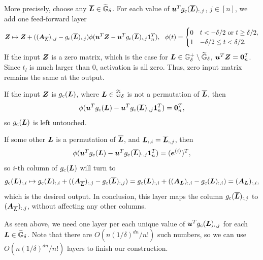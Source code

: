 More precisely, choose any $\overline {{\bm{L}}} \in \widetilde{{\mathbb{G}}}_{\delta}$.
For each value of ${\bm{u}}^T g_{\rm c}(\overline {{\bm{L}}})_{:,j}$, $j \in [n]$, we add one feed-forward layer
\begin{equation*}
    {\bm{Z}} \mapsto {\bm{Z}} + (({\bm{A}}_{\overline {{\bm{L}}}})_{:,j} - g_{\rm c}({\overline {{\bm{L}}}})_{:,j}) \phi ({\bm{u}}^T {\bm{Z}} - {\bm{u}}^T g_{\rm c}({\overline {{\bm{L}}}})_{:,j} {\bm{1}}_n^T),
    ~~
    \phi(t) = 
    \begin{cases}
    0 & t < -\delta/2 \text{ or } t \geq \delta/2,\\
    1 & -\delta/2 \leq t < \delta/2.
    \end{cases}
\end{equation*}
If the input ${\bm{Z}}$ is a zero matrix, which is the case for ${\bm{L}} \in {\mathbb{G}}^+_{\delta} \setminus \widetilde{{\mathbb{G}}}_{\delta}$, ${\bm{u}}^T {\bm{Z}} = {\bm{0}}_n^T$. Since $t_l$ is much larger than $0$, activation is all zero. Thus, zero input matrix remains the same at the output.

If the input ${\bm{Z}}$ is $g_{\rm c}({\bm{L}})$, where ${\bm{L}} \in \widetilde{{\mathbb{G}}}_{\delta}$ is not a permutation of $\overline {{\bm{L}}}$, then 
\begin{equation*}
    \phi({\bm{u}}^T g_{\rm c}({\bm{L}}) - {\bm{u}}^T g_{\rm c}({\overline {{\bm{L}}}})_{:,j} {\bm{1}}_n^T) = {\bm{0}}_n^T,   
\end{equation*}
so $g_{\rm c}({\bm{L}})$ is left untouched.

If some other ${\bm{L}}$ is a permutation of $\overline {{\bm{L}}}$, and ${\bm{L}}_{:,i} = \overline {{\bm{L}}}_{:,j}$, then 
\begin{equation*}
    \phi({\bm{u}}^T g_{\rm c}({\bm{L}}) - {\bm{u}}^T g_{\rm c}({\overline {{\bm{L}}}})_{:,j} {\bm{1}}_n^T) = ({\bm{e}}^{(i)})^T,
\end{equation*}
so $i$-th column of $g_{\rm c}({\bm{L}})$ will turn to
\begin{equation*}
    g_{\rm c}({\bm{L}})_{:,i} \mapsto
    g_{\rm c}({\bm{L}})_{:,i} + (({\bm{A}}_{\overline {{\bm{L}}}})_{:,j} - g_{\rm c}({\overline {{\bm{L}}}})_{:,j})
    = g_{\rm c}({\bm{L}})_{:,i} + (({\bm{A}}_{\bm{L}})_{:,i} - g_{\rm c}({\bm{L}})_{:,i})
    = ({\bm{A}}_{\bm{L}})_{:,i},
\end{equation*}
which is the desired output.
In conclusion, this layer maps the column $g_{\rm c}(\overline {{\bm{L}}})_{:,j}$ to $({\bm{A}}_{\overline {{\bm{L}}}})_{:,j}$, without affecting any other columns.

As seen above, we need one layer per each unique value of ${\bm{u}}^T g_{\rm c}({\bm{L}})_{:,j}$ for each ${\bm{L}} \in \widetilde{{\mathbb{G}}}_{\delta}$. Note that there are $O(n(1/\delta)^{dn} / n!)$ such numbers, so we can use $O(n(1/\delta)^{dn} / n!)$ layers to finish our construction.


